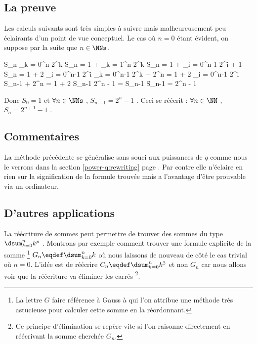 \subsection{La preuve}

Les calculs suivants sont très simples à suivre mais malheureusement peu éclairants d'un point de vue conceptuel. Le cas où $n = 0$ étant évident, on suppose par la suite que $n \in \NNs$.

\begin{focusproof}
\begin{explain}[style = sar, ope = \iff]
	S_n \eqdef \dsum_{k = 0}^{n} 2^k
		\explnext{}
	S_n = 1 + \dsum_{k = 1}^{n} 2^k
	S_n = 1 + \dsum_{i = 0}^{n-1} 2^{i + 1}
		\explnext{}
	S_n = 1 + 2 \dsum_{i = 0}^{n-1} 2^i
	\dsum_{k = 0}^{n-1} 2^k + 2^n = 1 + 2 \dsum_{i = 0}^{n-1} 2^i
		\explnext{}
	S_{n-1} + 2^n = 1 + 2 S_{n-1}
		\explnext{}
	2^n - 1 = S_{n-1}
		\explnext{}
	S_{n-1} = 2^n - 1
\end{explain}

\medskip

Donc $S_0 = 1$ et $\forall n \in \NNs$ , $S_{n-1} = 2^n - 1$ .
Ceci se réécrit :
$\forall n \in \NN$ , $S_n = 2^{n+1} - 1$ .
\end{focusproof}




\subsection{Commentaires}

La méthode précédente se généralise sans souci aux puissances de $q$ comme nous le verrons dans la section \ref{power-q:rewriting} page \pageref{power-q:rewriting}.
Par contre elle n'éclaire en rien sur la signification de la formule trouvée mais a l'avantage d'être prouvable via un ordinateur.




\subsection{D'autres applications}

La réécriture de sommes peut permettre de trouver des sommes du type $\dsum_{k = 0}^{n} k^p$ .
Montrons par exemple comment trouver une formule explicite de la somme
\footnote{
	La lettre $G$ faire référence à Gauss à qui l'on attribue une méthode très astucieuse pour calculer cette somme en la réordonnant.
}
$G_n \eqdef \dsum_{k = 0}^{n} k$ où nous laissons de nouveau de côté le cas trivial où $n = 0$.
L'idée est de réécrire $C_n \eqdef \dsum_{k = 0}^{n} k^2$ et non $G_n$ car nous allons voir que la réécriture va éliminer les carrés
\footnote{
	Ce principe d'élimination se repère vite si l'on raisonne directement en réécrivant la somme cherchée $G_n$.
}.

